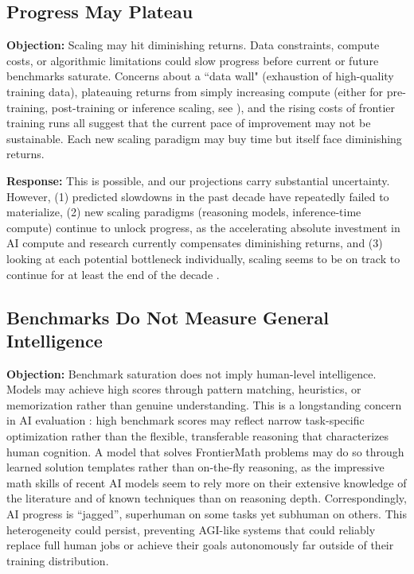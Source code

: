 \documentclass[letterpaper,twocolumn]{article}
\newcommand{\revised}[1]{#1}
\begin{document}
\subsection{Progress May Plateau}
\label{subsec:alt_plateau}

\textbf{Objection:} Scaling may hit diminishing returns.
Data constraints, compute costs, or algorithmic limitations could slow progress before current or future benchmarks saturate. \revised{Concerns about a ``data wall" (exhaustion of high-quality training data), plateauing returns from simply increasing compute (either for pre-training, post-training or inference scaling, see \citet{ord_inference_2025}), and the rising costs of frontier training runs all suggest that the current pace of improvement may not be sustainable. Each new scaling paradigm may buy time but itself face diminishing returns.}

\textbf{Response:} This is possible, and our projections carry substantial uncertainty.
However, (1) predicted slowdowns in the past decade have repeatedly failed to materialize, (2) new scaling paradigms (reasoning models, inference-time compute) continue to unlock progress, as the accelerating absolute investment in AI compute and research currently compensates diminishing returns, and (3) looking at each potential bottleneck individually, scaling seems to be on track to continue for at least the end of the decade \citep{sevilla_can_2024}.

\subsection{Benchmarks Do Not Measure General Intelligence}
\label{subsec:alt_benchmarks}

\textbf{Objection:} Benchmark saturation does not imply human-level intelligence.
Models may achieve high scores through pattern matching, heuristics, or memorization rather than genuine understanding. \revised{This is a longstanding concern in AI evaluation \citep{chollet_measure_2019}: high benchmark scores may reflect narrow task-specific optimization rather than the flexible, transferable reasoning that characterizes human cognition. A model that solves FrontierMath problems may do so through learned solution templates rather than on-the-fly reasoning, as the impressive math skills of recent AI models seem to rely more on their extensive knowledge of the literature and of known techniques than on reasoning depth. Correspondingly, AI progress is ``jagged'', superhuman on some tasks yet subhuman on others. This heterogeneity could persist, preventing AGI-like systems that could reliably replace full human jobs or achieve their goals autonomously far outside of their training distribution.}
\end{document}
